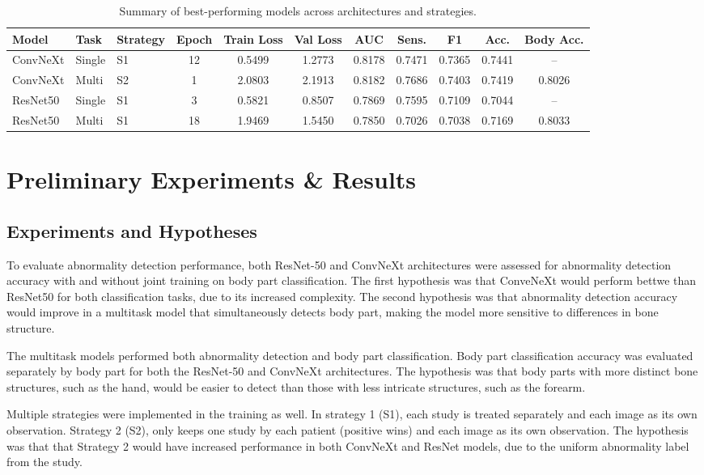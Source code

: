 \documentclass[conference]{IEEEtran}
\begin{document}
\begin{table}[t]
\centering
\caption{Summary of best-performing models across architectures and strategies.}
\label{tab:final_results}
\begin{tabular}{l l l c c c c c c c c}
\hline
Model & Task & Strategy & Epoch & Train Loss & Val Loss & AUC & Sens. & F1 & Acc. & Body Acc. \\
\hline
ConvNeXt & Single & S1 & 12 & 0.5499 & 1.2773 & 0.8178 & 0.7471 & 0.7365 & 0.7441 & -- \\
ConvNeXt & Multi  & S2 & 1  & 2.0803 & 2.1913 & 0.8182 & 0.7686 & 0.7403 & 0.7419 & 0.8026 \\
ResNet50 & Single & S1 & 3  & 0.5821 & 0.8507 & 0.7869 & 0.7595 & 0.7109 & 0.7044 & -- \\
ResNet50 & Multi  & S1 & 18 & 1.9469 & 1.5450 & 0.7850 & 0.7026 & 0.7038 & 0.7169 & 0.8033 \\
\hline
\end{tabular}
\end{table}

\section{Preliminary Experiments \& Results}
\subsection{\textbf{Experiments and Hypotheses}}
To evaluate abnormality detection performance, both ResNet-50 and ConvNeXt architectures were assessed for abnormality detection accuracy with and without joint training on body part classification. The first hypothesis was that ConveNeXt would perform bettwe than ResNet50 for both classification tasks, due to its increased complexity. The second hypothesis was that abnormality detection accuracy would improve in a multitask model that simultaneously detects body part, making the model more sensitive to differences in bone structure. 

The multitask models performed both abnormality detection and body part classification. Body part classification accuracy was evaluated separately by body part for both the ResNet-50 and ConvNeXt architectures. The hypothesis was that body parts with more distinct bone structures, such as the hand, would be easier to detect than those with less intricate structures, such as the forearm. 

Multiple strategies were implemented in the training as well. In strategy 1 (S1), each study is treated separately and each image as its own observation. Strategy 2 (S2), only keeps one study by each patient (positive wins) and each image as its own observation. The hypothesis was that that Strategy 2 would have increased performance in both ConvNeXt and ResNet models, due to the uniform abnormality label from the study.
\end{document}
